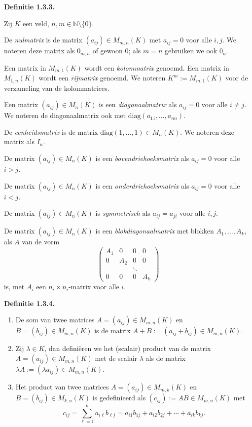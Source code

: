 \documentclass[10pt,a4paper]{article}
\newenvironment{res}[1]{%
  \par\noindent\textbf{Definitie #1.}~\ignorespaces
}{%
  \par\vspace{2pt}\normalfont
}
\begin{document}
\begin{res}{1.3.3}
Zij $K$ een veld, $n,m\in\mathbb N\setminus\{0\}$.
\begin{myenum}
\item De \textit{nulmatrix} is de matrix $(a_{ij})\in M_{m,n}(K)$ met $a_{ij}=0$ voor alle $i,j$. We noteren deze matrix als $0_{m,n}$ of gewoon $0$; als $m=n$ gebruiken we ook $0_n$.
\item Een matrix in $M_{m,1}(K)$ wordt een \textit{kolommatrix} genoemd. Een matrix in $M_{1,n}(K)$ wordt een \textit{rijmatrix} genoemd. We noteren $K^m:=M_{m,1}(K)$ voor de verzameling van de kolommatrices.
\item Een matrix $(a_{ij})\in M_n(K)$ is een \textit{diagonaalmatrix} als $a_{ij}=0$ voor alle $i\ne j$. We noteren de diagonaalmatrix ook met $\mathrm{diag}(a_{11},\dots,a_{nn})$.
\item De \textit{eenheidsmatrix} is de matrix $\mathrm{diag}(1,\dots,1)\in M_n(K)$. We noteren deze matrix als $I_n$.
\item De matrix $(a_{ij})\in M_n(K)$ is een \textit{bovendriehoeksmatrix} als $a_{ij}=0$ voor alle $i>j$.
\item De matrix $(a_{ij})\in M_n(K)$ is een \textit{onderdriehoeksmatrix} als $a_{ij}=0$ voor alle $i<j$.
\item De matrix $(a_{ij})\in M_n(K)$ is \textit{symmetrisch} als $a_{ij}=a_{ji}$ voor alle $i,j$.
\item De matrix $(a_{ij})\in M_n(K)$ is een \textit{blokdiagonaalmatrix} met blokken $A_1,\dots,A_k$, als $A$ van de vorm
\[
\begin{pmatrix} A_1&0&0&0\\ 0&A_2&0&0\\ &&\ddots&\\ 0&0&0&A_k\end{pmatrix}
\]
is, met $A_i$ een $n_i\times n_i$-matrix voor alle $i$.
\end{myenum}
\end{res}

\begin{res}{1.3.4}
\begin{enumerate}[label=(\arabic*),leftmargin=1.8em,itemsep=1pt,topsep=1pt]
\item De som van twee matrices $A=(a_{ij})\in M_{m,n}(K)$ en $B=(b_{ij})\in M_{m,n}(K)$ is de matrix $A+B:=(a_{ij}+b_{ij})\in M_{m,n}(K)$.
\item Zij $\lambda\in K$, dan defini\"eren we het (scalair) product van de matrix $A=(a_{ij})\in M_{m,n}(K)$ met de scalair $\lambda$ als de matrix $\lambda A:=(\lambda a_{ij})\in M_{m,n}(K)$.
\item Het product van twee matrices $A=(a_{ij})\in M_{m,k}(K)$ en $B=(b_{ij})\in M_{k,n}(K)$ is gedefinieerd als $(c_{ij}):=AB\in M_{m,n}(K)$ met
\[
c_{ij}=\sum_{\ell=1}^k a_{i\ell}b_{\ell j}=a_{i1}b_{1j}+a_{i2}b_{2j}+\cdots+a_{ik}b_{kj}.
\]
\end{enumerate}
\end{res}
\end{document}
